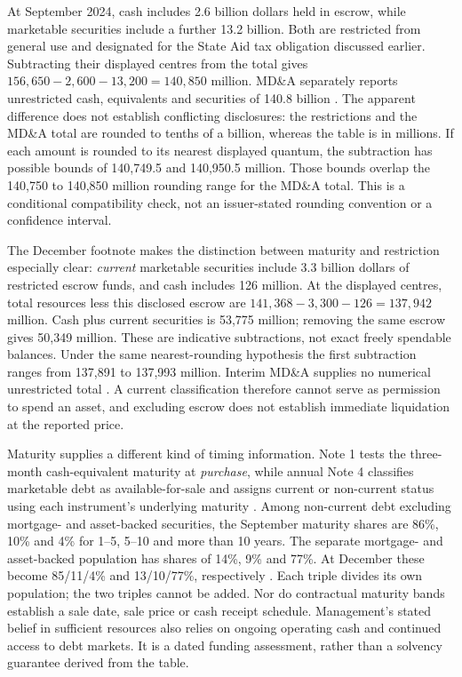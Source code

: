 At September 2024, cash includes 2.6 billion dollars held in escrow, while
marketable securities include a further 13.2 billion. Both are restricted from
general use and designated for the State Aid tax obligation discussed earlier.
Subtracting their displayed centres from the total gives
$156{,}650-2{,}600-13{,}200=140{,}850$ million. MD\&A separately reports
unrestricted cash, equivalents and securities of 140.8 billion
\citep[printed pp.~25--26 and Note 4]{apple2024}. The apparent difference
does not establish conflicting disclosures: the restrictions and the MD\&A
total are rounded to tenths of a billion, whereas the table is in millions.
If each amount is rounded to its nearest displayed quantum, the subtraction
has possible bounds of 140,749.5 and 140,950.5 million. Those bounds overlap
the 140,750 to 140,850 million rounding range for the MD\&A total. This is a
conditional compatibility check, not an issuer-stated rounding convention
or a confidence interval.

The December footnote makes the distinction between maturity and restriction
especially clear: \emph{current} marketable securities include 3.3 billion
dollars of restricted escrow funds, and cash includes 126 million. At the
displayed centres, total resources less this disclosed escrow are
$141{,}368-3{,}300-126=137{,}942$ million. Cash plus current securities is
53,775 million; removing the same escrow gives 50,349 million. These are
indicative subtractions, not exact freely spendable balances. Under the same
nearest-rounding hypothesis the first subtraction ranges from 137,891 to
137,993 million. Interim MD\&A supplies no numerical unrestricted total
\citep[Note 4 and printed p.~16]{apple2025q1}. A current classification
therefore cannot serve as permission to spend an asset, and excluding escrow
does not establish immediate liquidation at the reported price.

Maturity supplies a different kind of timing information. Note 1 tests the
three-month cash-equivalent maturity at \emph{purchase}, while annual Note 4
classifies marketable debt as available-for-sale and assigns current or
non-current status using each instrument's underlying maturity
\citep[printed pp.~34 and 37]{apple2024}. Among non-current debt excluding
mortgage- and asset-backed securities, the September maturity shares are
86\%, 10\% and 4\% for 1--5, 5--10 and more than 10 years. The separate
mortgage- and asset-backed population has shares of 14\%, 9\% and 77\%.
At December these become 85/11/4\% and 13/10/77\%, respectively
\citep[Note 4, printed p.~8]{apple2025q1}. Each triple divides its own
population; the two triples cannot be added. Nor do contractual maturity
bands establish a sale date, sale price or cash receipt schedule. Management's
stated belief in sufficient resources also relies on ongoing operating cash
and continued access to debt markets. It is a dated funding assessment,
rather than a solvency guarantee derived from the table.

